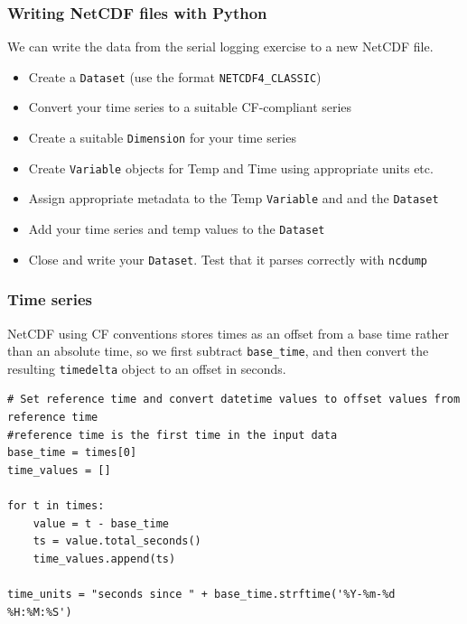 \documentclass[aspectratio=1610,9pt]{beamer} %
\begin{document}
\begin{frame}
\frametitle{Writing NetCDF files with
Python}

We can write the data from the serial logging exercise to a new NetCDF
file.

\begin{itemize}
\itemsep1pt\parskip0pt
\item
  Create a \texttt{Dataset} (use the format \texttt{NETCDF4\_CLASSIC})
\item
  Convert your time series to a suitable CF-compliant series
\item
  Create a suitable \texttt{Dimension} for your time series
\item
  Create \texttt{Variable} objects for Temp and Time using appropriate
  units etc.
\item
  Assign appropriate metadata to the Temp \texttt{Variable} and and the
  \texttt{Dataset}
\item
  Add your time series and temp values to the \texttt{Dataset}
\item
  Close and write your \texttt{Dataset}. Test that it parses correctly
  with \texttt{ncdump}
\end{itemize}

\end{frame}
\begin{frame}[fragile]
\frametitle{Time series}

NetCDF using CF conventions stores times as an offset from a base time
rather than an absolute time, so we first subtract \texttt{base\_time},
and then convert the resulting \texttt{timedelta} object to an offset in
seconds.

\begin{verbatim}
# Set reference time and convert datetime values to offset values from reference time
#reference time is the first time in the input data
base_time = times[0]
time_values = []

for t in times:
    value = t - base_time
    ts = value.total_seconds()
    time_values.append(ts)

time_units = "seconds since " + base_time.strftime('%Y-%m-%d %H:%M:%S')
\end{verbatim}

\end{frame}
\end{document}
